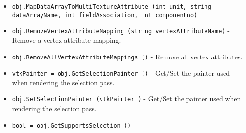 \begin{itemize}
\item  \verb|obj.MapDataArrayToMultiTextureAttribute (int unit, string dataArrayName, int fieldAssociation, int componentno)|

\item  \verb|obj.RemoveVertexAttributeMapping (string vertexAttributeName)| -  Remove a vertex attribute mapping.

\item  \verb|obj.RemoveAllVertexAttributeMappings ()| -  Remove all vertex attributes.

\item  \verb|vtkPainter = obj.GetSelectionPainter ()| -  Get/Set the painter used when rendering the selection pass.

\item  \verb|obj.SetSelectionPainter (vtkPainter )| -  Get/Set the painter used when rendering the selection pass.

\item  \verb|bool = obj.GetSupportsSelection ()|

\end{itemize}
